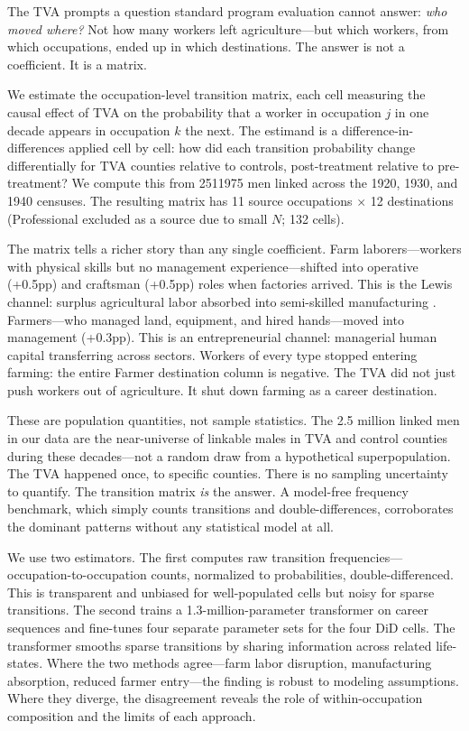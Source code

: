 \documentclass[12pt]{article}
\begin{document}
The TVA prompts a question standard program evaluation cannot answer: \textit{who moved where?} Not how many workers left agriculture---but which workers, from which occupations, ended up in which destinations. The answer is not a coefficient. It is a matrix.

We estimate the occupation-level transition matrix, each cell measuring the causal effect of TVA on the probability that a worker in occupation $j$ in one decade appears in occupation $k$ the next. The estimand is a difference-in-differences applied cell by cell: how did each transition probability change differentially for TVA counties relative to controls, post-treatment relative to pre-treatment? We compute this from \num{2511975} men linked across the 1920, 1930, and 1940 censuses. The resulting matrix has 11 source occupations $\times$ 12 destinations (Professional excluded as a source due to small $N$; 132 cells).

The matrix tells a richer story than any single coefficient. Farm laborers---workers with physical skills but no management experience---shifted into operative (+0.5pp) and craftsman (+0.5pp) roles when factories arrived. This is the Lewis channel: surplus agricultural labor absorbed into semi-skilled manufacturing \citep{lewis1954}. Farmers---who managed land, equipment, and hired hands---moved into management (+0.3pp). This is an entrepreneurial channel: managerial human capital transferring across sectors. Workers of every type stopped entering farming: the entire Farmer destination column is negative. The TVA did not just push workers out of agriculture. It shut down farming as a career destination.

These are population quantities, not sample statistics. The 2.5 million linked men in our data are the near-universe of linkable males in TVA and control counties during these decades---not a random draw from a hypothetical superpopulation. The TVA happened once, to specific counties. There is no sampling uncertainty to quantify. The transition matrix \textit{is} the answer. A model-free frequency benchmark, which simply counts transitions and double-differences, corroborates the dominant patterns without any statistical model at all.

We use two estimators. The first computes raw transition frequencies---occupation-to-occupation counts, normalized to probabilities, double-differenced. This is transparent and unbiased for well-populated cells but noisy for sparse transitions. The second trains a 1.3-million-parameter transformer on career sequences and fine-tunes four separate parameter sets for the four DiD cells. The transformer smooths sparse transitions by sharing information across related life-states. Where the two methods agree---farm labor disruption, manufacturing absorption, reduced farmer entry---the finding is robust to modeling assumptions. Where they diverge, the disagreement reveals the role of within-occupation composition and the limits of each approach.
\end{document}
